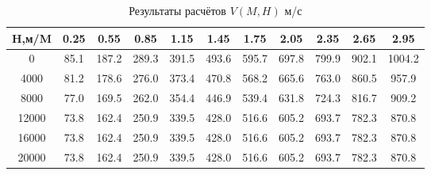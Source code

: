 \begin{table}[H]
\centering
\caption{Результаты расчётов $V(M,H)$ м/с}
\label{V}
\begin{tabular}{|c|c|c|c|c|c|c|c|c|c|c|}
\toprule
H,м/M &  0.25 &   0.55 &   0.85 &   1.15 &   1.45 &   1.75 &   2.05 &   2.35 &   2.65 &    2.95 \\
\midrule
0     &  85.1 &  187.2 &  289.3 &  391.5 &  493.6 &  595.7 &  697.8 &  799.9 &  902.1 &  1004.2 \\
4000  &  81.2 &  178.6 &  276.0 &  373.4 &  470.8 &  568.2 &  665.6 &  763.0 &  860.5 &   957.9 \\
8000  &  77.0 &  169.5 &  262.0 &  354.4 &  446.9 &  539.4 &  631.8 &  724.3 &  816.7 &   909.2 \\
12000 &  73.8 &  162.4 &  250.9 &  339.5 &  428.0 &  516.6 &  605.2 &  693.7 &  782.3 &   870.8 \\
16000 &  73.8 &  162.4 &  250.9 &  339.5 &  428.0 &  516.6 &  605.2 &  693.7 &  782.3 &   870.8 \\
20000 &  73.8 &  162.4 &  250.9 &  339.5 &  428.0 &  516.6 &  605.2 &  693.7 &  782.3 &   870.8 \\
\bottomrule
\end{tabular}
\end{table}
